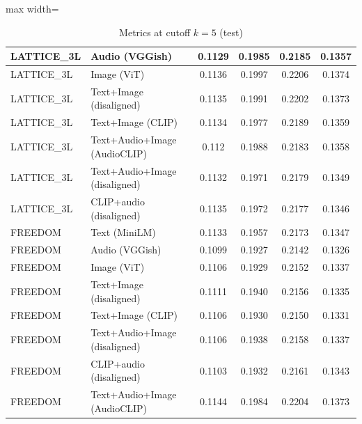 \begin{table}[H]
\begin{adjustbox}{max width=\textwidth}
\begin{tabular}{|l|l|c|c|c|c|}
    \hline
    LATTICE\_3L & Audio (VGGish) & 0.1129 & 0.1985 & 0.2185 & 0.1357 \\
    \hline
    LATTICE\_3L & Image (ViT) & 0.1136 & 0.1997 & 0.2206 & 0.1374 \\
    \hline
    LATTICE\_3L & Text+Image (disaligned) & 0.1135 & 0.1991 & 0.2202 & 0.1373 \\
    \hline
    LATTICE\_3L & Text+Image (CLIP) & 0.1134 & 0.1977 & 0.2189 & 0.1359 \\
    \hline
    LATTICE\_3L & Text+Audio+Image (AudioCLIP) & 0.112 & 0.1988 & 0.2183 & 0.1358 \\
    \hline
    LATTICE\_3L & Text+Audio+Image (disaligned) & 0.1132 & 0.1971 & 0.2179 & 0.1349 \\
    \hline
    LATTICE\_3L & CLIP+audio (disaligned) & 0.1135 & 0.1972 & 0.2177 & 0.1346 \\
    \hline
    FREEDOM & Text (MiniLM) & 0.1133 & 0.1957 & 0.2173 & 0.1347 \\
    \hline
    FREEDOM & Audio (VGGish) & 0.1099 & 0.1927 & 0.2142 & 0.1326 \\
    \hline
    FREEDOM & Image (ViT) & 0.1106 & 0.1929 & 0.2152 & 0.1337 \\
    \hline
    FREEDOM & Text+Image (disaligned) & 0.1111 & 0.1940 & 0.2156 & 0.1335 \\
    \hline
    FREEDOM & Text+Image (CLIP) & 0.1106 & 0.1930 & 0.2150 & 0.1331 \\
    \hline
    FREEDOM & Text+Audio+Image (disaligned) & 0.1106 & 0.1938 & 0.2158 & 0.1337 \\
    \hline
    FREEDOM & CLIP+audio (disaligned) & 0.1103 & 0.1932 & 0.2161 & 0.1343 \\
    \hline
    FREEDOM & Text+Audio+Image (AudioCLIP) & 0.1144 & 0.1984 & 0.2204 & 0.1373 \\
    \hline
    \end{tabular}
    \end{adjustbox}
    \caption{Metrics at cutoff $k=5$ (test)}
    \label{tab:metrics_k5}
\end{table}

